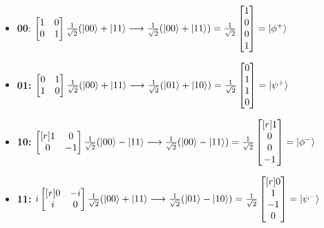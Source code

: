 \documentclass{article}
\theoremstyle{definition}
\begin{document}
\begin{itemize}
\item \textbf{00}: $\begin{bmatrix} 1 & 0 \\ 0 & 1 \end{bmatrix}  \frac{1}{\sqrt{2}} (\ket{00} + \ket{11} \longrightarrow  \frac{1}{\sqrt{2}} (\ket{00} + \ket{11}) =
\frac{1}{\sqrt{2}} \begin{bmatrix} 1 \\ 0 \\  0 \\ 1 \end{bmatrix} = \ket{\phi^+}$

\item \textbf{01:} $\begin{bmatrix} 0 & 1 \\ 1 & 0 \end{bmatrix} \frac{1}{\sqrt{2}} (\ket{00} + \ket{11} \longrightarrow  \frac{1}{\sqrt{2}} (\ket{01} + \ket{10}) =
\frac{1}{\sqrt{2}} \begin{bmatrix} 0 \\ 1 \\  1 \\ 0 \end{bmatrix} = \ket{\psi^+}$

\item \textbf{10:} $\begin{bmatrix}[r] 1 & 0 \\ 0 & -1 \end{bmatrix}  \frac{1}{\sqrt{2}} (\ket{00} - \ket{11} \longrightarrow  \frac{1}{\sqrt{2}} (\ket{00} - \ket{11}) =
\frac{1}{\sqrt{2}} \begin{bmatrix}[r] 1 \\ 0 \\  0 \\  -1 \end{bmatrix} = \ket{\phi^-}$

\item \textbf{11:}  $i  \begin{bmatrix}[r] 0 & -i \\ i & 0 \end{bmatrix} \frac{1}{\sqrt{2}} (\ket{00} + \ket{11} \longrightarrow  \frac{1}{\sqrt{2}} (\ket{01} - \ket{10}) =
\frac{1}{\sqrt{2}} \begin{bmatrix}[r] 0 \\ 1 \\  -1 \\ 0 \end{bmatrix} = \ket{\psi^-}$
\end{itemize}
\end{document}
